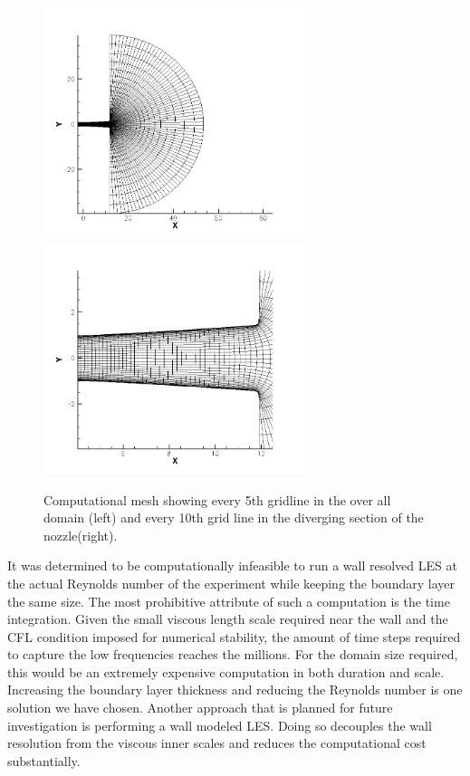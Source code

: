 \documentclass[]{aiaa-tc}%
\begin{document}
\begin{figure}[!htb]%
	\centering
  	\includegraphics[width = 3in]{figs/full5.png}
	\includegraphics[width = 3in]{figs/zoom10.png}
	\caption{Computational mesh showing every 5th gridline in the over all domain (left) and every 10th grid line in the diverging section of the nozzle(right).  }
 	\label{fig:mesh}
\end{figure}

It was determined to be computationally infeasible to run a wall resolved LES at the actual Reynolds number of the experiment while keeping the boundary layer the same size.  The most prohibitive attribute of such a computation is the time integration.  Given the small viscous length scale required near the wall and the CFL condition imposed for numerical stability, the amount of time steps required to capture the low frequencies reaches the millions.  For the domain size required, this would be an extremely expensive computation in both duration and scale.  
Increasing the boundary layer thickness and reducing the Reynolds number is one solution we have chosen.  Another approach that is planned for future investigation is performing a wall modeled LES.  Doing so decouples the wall resolution from the viscous inner scales and reduces the computational cost substantially.
\end{document}
